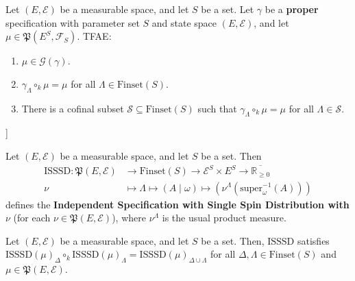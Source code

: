 \begin{lemma}
    \label{lem:gibbs-measure-char}

    Let $(E, \mathcal{E})$ be a measurable space, and let $S$ be a set. Let $\gamma$ be a \textbf{proper} specification with parameter set $S$ and state space $(E, \mathcal{E})$, and let $\mu\in\mathfrak{P}(E^S, \mathcal{F}_S)$. TFAE:
    \begin{enumerate}
        \item $\mu\in\mathcal{G}(\gamma)$.
        \item $\gamma_\Lambda\circ_k\mu=\mu$ for all $\Lambda\in\text{Finset}(S)$.
        \item There is a cofinal subset $\mathcal{S}\subseteq\text{Finset}(S)$ such that $\gamma_\Lambda\circ_k\mu=\mu$ for all $\Lambda\in\mathcal{S}$.
    \end{enumerate}
\end{lemma}

\begin{definition}[Independent Specification with Single Spin Distribution [ISSSD]]
    \label{def:ISSSD}

    Let $(E, \mathcal{E})$ be a measurable space, and let $S$ be a set. Then
    \begin{align*}
        \text{ISSSD}:\mathfrak{P}(E, \mathcal{E})&\to\text{Finset}(S)\to\mathcal{E}^S\times E^S\to\overline{\mathbb{R}_{\geq0}}\\
        \nu&\mapsto\Lambda\mapsto(A\mid\omega)\mapsto\left(\nu^\Lambda\left(\text{super}_\omega^{-1}(A)\right)\right)
    \end{align*}
    defines the \textbf{Independent Specification with Single Spin Distribution with $\nu$} (for each $\nu\in\mathfrak{P}(E, \mathcal{E})$), where $\nu^\Lambda$ is the usual product measure.
\end{definition}

\begin{lemma}
    \label{lem:isssd-strong-consistency}

    Let $(E, \mathcal{E})$ be a measurable space, and let $S$ be a set. Then, $\text{ISSSD}$ satisfies $\text{ISSSD}(\mu)_\Delta\circ_k\text{ISSSD}(\mu)_\Lambda=\text{ISSSD}(\mu)_{\Delta\cup\Lambda}$ for all $\Delta, \Lambda\in\text{Finset}(S)$ and $\mu\in\mathfrak{P}(E, \mathcal{E})$.
\end{lemma}

